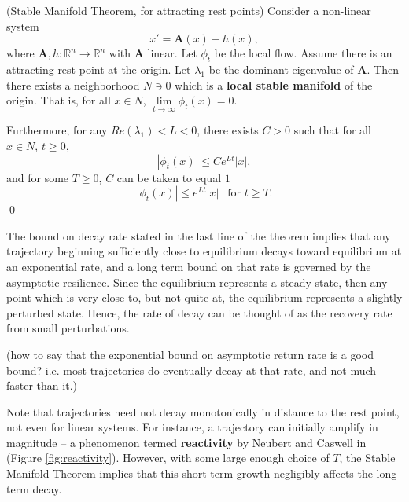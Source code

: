 \begin{theorem}(Stable Manifold Theorem, for attracting rest points)
	Consider a non-linear system 
	$$x' = \mathbf{A}(x) + h(x),$$ 
	where $\mathbf{A}, h: \mathbb{R}^n \to \mathbb{R}^n$ with $\mathbf{A}$ linear.  Let $\phi_t$ be the local flow.
	Assume there is an attracting rest point at the origin. 
	Let $\lambda_1$ be the dominant eigenvalue of $\mathbf{A}$. Then there exists a neighborhood $N \ni 0$ which is a \textbf{local stable manifold} of the origin. 
	That is, for all $x \in N$, $\lim\limits_{t \to \infty} \phi_t(x)= 0$.
	
	Furthermore, for any $Re(\lambda_1) < L < 0$, there exists $C >0$ such that for all $x \in N$, $t \geq 0$,
	$$|\phi_t(x)| \leq Ce^{Lt}|x|,$$
 	and for some $T \geq 0$, $C$ can be taken to equal $1$
	$$|\phi_t(x)| \leq e^{L t}|x| ~ ~\text{ for } t \geq T.$$
	 \qed
\end{theorem}

The bound on decay rate stated in the last line of the theorem implies that any trajectory beginning sufficiently close to equilibrium decays toward equilibrium at an exponential rate, and a long term bound on that rate is governed by the asymptotic resilience. Since the equilibrium represents a steady state, then any point which is very close to, but not quite at, the equilibrium represents a slightly perturbed state. Hence, the rate of decay can be thought of as the recovery rate from small perturbations. 

(how to say that the exponential bound on asymptotic return rate is a good bound? i.e. most trajectories do eventually decay at that rate, and not much faster than it.)


\begin{remark}
	Note that trajectories need not decay monotonically in distance to the rest point, not even for linear systems. For instance, a trajectory can initially amplify in magnitude -- a phenomenon termed \textbf{reactivity} by Neubert and Caswell in \cite{neubertAlternativesResilienceMeasuring1997a} (Figure \ref{fig:reactivity}). However, with some large enough choice of $T$, the Stable Manifold Theorem implies that this short term growth negligibly affects the long term decay. 
\end{remark}

